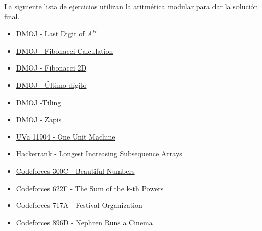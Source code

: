 La siguiente lista de ejercicios utilizan la aritmética modular para dar la solución final.

\begin{itemize}
	
	\item \href{https://dmoj.uclv.edu.cu/problem/digitlast}{DMOJ - Last Digit of $A^B$}
	\item \href{https://dmoj.uclv.edu.cu/problem/fibonaccicalculatio}{ DMOJ - Fibonacci Calculation}
	\item \href{https://dmoj.uclv.edu.cu/problem/fibonacci}{DMOJ - Fibonacci 2D}
	\item \href{https://dmoj.uclv.edu.cu/problem/lastdigit}{DMOJ - Último dígito}
	\item \href{https://dmoj.uclv.edu.cu/problem/campipvc}{DMOJ -Tiling}
	\item \href{https://dmoj.uclv.edu.cu/problem/zapis}{DMOJ - Zapis}
	\item \href{https://uva.onlinejudge.org/index.php?option=com_onlinejudge&Itemid=8&page=show_problem&problem=3055}{UVa 11904 - One Unit Machine}
	\item \href{https://www.hackerrank.com/contests/world-codesprint-5/challenges/longest-increasing-subsequence-arrays}{Hackerrank - Longest Increasing Subsequence Arrays}
	\item \href{http://codeforces.com/problemset/problem/300/C}{Codeforces 300C - Beautiful Numbers}
	\item \href{http://codeforces.com/problemset/problem/622/F}{Codeforces 622F - The Sum of the k-th Powers}
	\item \href{http://codeforces.com/problemset/problem/717/A}{Codeforces 717A - Festival Organization}
	\item \href{http://codeforces.com/problemset/problem/896/D}{Codeforces 896D - Nephren Runs a Cinema}
\end{itemize}